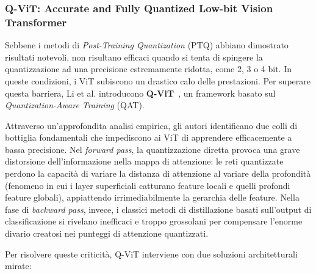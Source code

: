 \subsubsection{Q-ViT: Accurate and Fully Quantized Low-bit Vision Transformer}
Sebbene i metodi di \textit{Post-Training Quantization} (PTQ) abbiano
dimostrato risultati notevoli, non risultano efficaci quando si tenta di
spingere la quantizzazione ad una precisione estremamente ridotta, come 2, 3 o
4 bit. In queste condizioni, i ViT subiscono un drastico calo delle
prestazioni. Per superare questa barriera, Li et al. introducono
\textbf{Q-ViT}~\cite{li2022qvitaccuratefullyquantized}, un framework basato sul
\textit{Quantization-Aware Training} (QAT). \par
Attraverso un'approfondita analisi empirica, gli autori identificano due colli
di bottiglia fondamentali che impediscono ai ViT di apprendere efficacemente a
bassa precisione. Nel \textit{forward pass}, la quantizzazione diretta provoca
una grave distorsione dell'informazione nella mappa di attenzione: le reti
quantizzate perdono la capacità di variare la distanza di attenzione al variare
della profondità (fenomeno in cui i layer superficiali catturano feature locali
e quelli profondi feature globali), appiattendo irrimediabilmente la gerarchia
delle feature. Nella fase di \textit{backward pass}, invece, i classici metodi
di distillazione basati sull'output di classificazione si rivelano inefficaci e
troppo grossolani per compensare l'enorme divario creatosi nei punteggi di
attenzione quantizzati. \par
Per risolvere queste criticità, Q-ViT interviene con due soluzioni
architetturali mirate:
